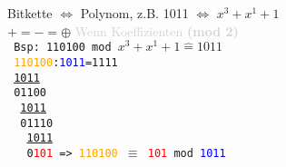 Bitkette $\Leftrightarrow$ Polynom, z.B. 1011 $\Leftrightarrow$ $x^3 + x ^1 + 1$\\
$+=-= \oplus$  \textcolor{lightgray}{Wenn Koeffizienten \textbf{(mod 2)}}\\

\texttt{ %
\newcommand{\divisor}{\underline{1011}\\}
Bsp: 110100 mod $x^3 + x ^1 + 1 \widehat{=}1011$\\
\textcolor{white}{|}\textcolor{orange}{110100}:\textcolor{blue}{1011}=1111\\
\textcolor{white}{|}\divisor
\textcolor{white}{|}01100\\
\textcolor{white}{|}~\divisor
\textcolor{white}{|}~01110\\
\textcolor{white}{|}~~\divisor
\textcolor{white}{|}~~0\textcolor{red}{101}   => \textcolor{orange}{110100} $\equiv$ \textcolor{red}{101} mod \textcolor{blue}{1011}
}







\clearpage